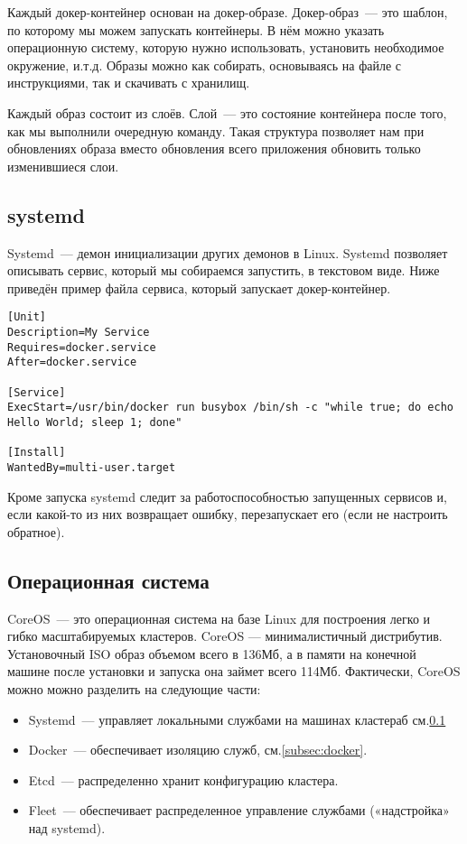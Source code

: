 	Каждый докер-контейнер основан на докер-образе. Докер-образ~--- это шаблон, по которому мы можем запускать контейнеры. В нём можно указать операционную систему, которую нужно использовать, установить необходимое окружение, и.т.д. Образы можно как собирать, основываясь на файле с инструкциями, так и скачивать с хранилищ.
	
	Каждый образ состоит из слоёв. Слой~--- это состояние контейнера после того, как мы выполнили очередную команду. Такая структура позволяет нам при обновлениях образа вместо обновления всего приложения обновить только изменившиеся слои.
	
\subsection{systemd}\label{subsec:systemd}
	Systemd~--- демон инициализации других демонов в Linux. Systemd позволяет описывать сервис, который мы собираемся запустить, в текстовом виде. Ниже приведён пример файла сервиса, который запускает докер-контейнер.
\begin{lstlisting}
[Unit]
Description=My Service
Requires=docker.service
After=docker.service

[Service]	
ExecStart=/usr/bin/docker run busybox /bin/sh -c "while true; do echo Hello World; sleep 1; done"

[Install]
WantedBy=multi-user.target
\end{lstlisting}

	Кроме запуска systemd следит за работоспособностью запущенных сервисов и, если какой-то из них возвращает ошибку, перезапускает его (если не настроить обратное).
	
\subsection{Операционная система}
	CoreOS~--- это операционная система на базе Linux для построения легко и гибко масштабируемых кластеров. CoreOS — минималистичный дистрибутив. Установочный ISO образ объемом всего в 136Мб, а в памяти на конечной машине после установки и запуска она займет всего 114Мб.
	Фактически, CoreOS можно можно разделить на следующие части:
\begin{itemize}
	\item Systemd~--- управляет локальными службами на машинах кластераб см.\ref{subsec:systemd}
	\item Docker~--- обеспечивает изоляцию служб, см.\ref{subsec:docker}.
	\item Etcd~--- распределенно хранит конфигурацию кластера.
	\item Fleet~--- обеспечивает распределенное управление службами («надстройка» над systemd).
\end{itemize}


